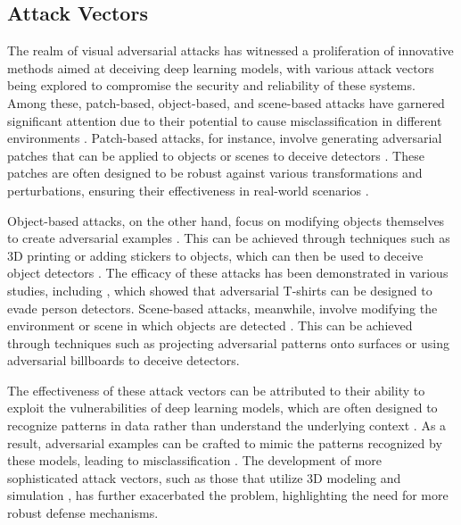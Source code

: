 \documentclass[11pt,a4paper]{article}
\begin{document}
\subsection{Attack Vectors}


The realm of visual adversarial attacks has witnessed a proliferation of innovative methods aimed at deceiving deep learning models, with various attack vectors being explored to compromise the security and reliability of these systems. Among these, patch-based, object-based, and scene-based attacks have garnered significant attention due to their potential to cause misclassification in different environments \cite{doi:10.1145/3128572.3140444}. Patch-based attacks, for instance, involve generating adversarial patches that can be applied to objects or scenes to deceive detectors \cite{arxiv:1707.08945}. These patches are often designed to be robust against various transformations and perturbations, ensuring their effectiveness in real-world scenarios \cite{doi:10.1007/978-3-030-10925-7_4}.

Object-based attacks, on the other hand, focus on modifying objects themselves to create adversarial examples \cite{arxiv:1807.07769}. This can be achieved through techniques such as 3D printing or adding stickers to objects, which can then be used to deceive object detectors \cite{doi:10.1109/iccvw.2019.00257}. The efficacy of these attacks has been demonstrated in various studies, including \cite{arxiv:1910.11099}, which showed that adversarial T-shirts can be designed to evade person detectors. Scene-based attacks, meanwhile, involve modifying the environment or scene in which objects are detected \cite{doi:10.1145/3377811.3380422}. This can be achieved through techniques such as projecting adversarial patterns onto surfaces or using adversarial billboards to deceive detectors.

The effectiveness of these attack vectors can be attributed to their ability to exploit the vulnerabilities of deep learning models, which are often designed to recognize patterns in data rather than understand the underlying context \cite{doi:10.1145/3274895.3274904}. As a result, adversarial examples can be crafted to mimic the patterns recognized by these models, leading to misclassification \cite{doi:10.1145/3398394}. The development of more sophisticated attack vectors, such as those that utilize 3D modeling and simulation \cite{doi:10.1016/j.neucom.2022.05.031}, has further exacerbated the problem, highlighting the need for more robust defense mechanisms.
\end{document}
